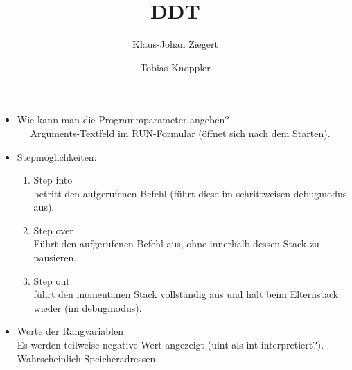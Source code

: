 \documentclass[a4paper,11pt]{scrartcl}
\title{DDT}
\author{Klaus-Johan Ziegert \and Tobias Knoppler}
\begin{document}
\maketitle

\section{}%
\begin{itemize}
  \item Wie kann man die Programmparameter angeben?\\
    ~~ Arguments-Textfeld im RUN-Formular (öffnet sich nach dem Starten).
  \item Stepmöglichkeiten:
    \begin{enumerate}
      \item Step into\\
        betritt den aufgerufenen Befehl (führt diese im schrittweisen debugmodus aus).
      \item Step over\\
        Führt den aufgerufenen Befehl aus, ohne innerhalb dessen Stack zu pausieren.
      \item Step out\\
        führt den momentanen Stack vollständig aus und hält beim Elternstack wieder (im debugmodus).
    \end{enumerate}
  \item Werte der Rangvariablen\\
    Es werden teilweise negative Wert angezeigt (uint als int interpretiert?).\\
    Wahrscheinlich Speicheradressen
\end{itemize}
\end{document}
